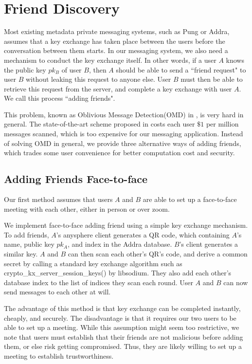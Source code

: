 \section{Friend Discovery}

Most existing metadata private messaging systems, such as Pung or Addra, assumes that a key exchange has taken place between the users before the conversation between them starts. In our messaging system, we also need a mechanism to conduct the key exchange itself. In other words, if a user $A$ knows the public key $pk_B$ of user $B$, then $A$ should be able to send a ``friend request" to user $B$ without leaking this request to anyone else. User $B$ must then be able to retrieve this request from the server, and complete a key exchange with user $A$. We call this process ``adding friends".

This problem, known as Oblivious Message Detection(OMD) in \cite{liutromer2021}, is very hard in general. The state-of-the-art scheme proposed in \cite{liutromer2021} costs each user $\$ 1$ per million messages scanned, which is too expensive for our messaging application. Instead of solving OMD in general, we provide three alternative ways of adding friends, which trades some user convenience for better computation cost and security.

\subsection{Adding Friends Face-to-face}
Our first method assumes that users $A$ and $B$ are able to set up a face-to-face meeting with each other, either in person or over zoom. 

We implement face-to-face adding friend using a simple key exchange mechanism. To add friends, $A$'s anysphere client generates a QR code, which containing $A$'s name, public key $pk_A$, and index in the Addra database. $B$'s client generates a similar key. $A$ and $B$ can then scan each other's QR's code,  and derive a common secret by calling a standard key exchange algorithm such as crypto\_kx\_server\_session\_keys()  by libsodium. They also add each other's database index to the list of indices they scan each round. User $A$ and $B$ can now send messages to each other at will.

The advantage of this method is that key exchange can be completed instantly, cheaply, and securely. The disadvantage is that it requires our two users to be able to set up a meeting. While this assumption might seem too restrictive, we note that users must establish that their friends are not malicious before adding them, or else risk getting compromised. Thus, they are likely willing to set up a meeting to establish trustworthiness. 

